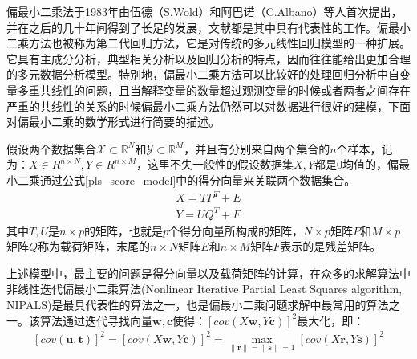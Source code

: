 偏最小二乘法于1983年由伍德（S.Wold）和阿巴诺（C.Albano）等人首次提出，并在之后的几十年间得到了长足的发展，文献\cite{KPLS,pls_PLS,pls_PLSR,pls_PLSR2,pls_PLSALL}都是其中具有代表性的工作。偏最小二乘方法也被称为第二代回归方法，它是对传统的多元线性回归模型的一种扩展。它具有主成分分析，典型相关分析以及回归分析的特点，因而往往能给出更加合理的多元数据分析模型。特别地，偏最小二乘方法可以比较好的处理回归分析中自变量多重共线性的问题，且当解释变量的数量超过观测变量的时候或者两者之间存在严重的共线性的关系的时候偏最小二乘方法仍然可以对数据进行很好的建模，下面对偏最小二乘的数学形式进行简要的描述。

假设两个数据集合${\mathcal{X} \subset \mathbb{R}^{N}}$和${\mathcal{Y} \subset \mathbb{R}^{M}}$，并且有分别来自两个集合的$n$个样本，记为：${X \in R^{n\times N},Y \in R^{n\times M}}$，这里不失一般性的假设数据集${X,Y}$都是${0}$均值的，偏最小二乘通过公式\ref{pls_score_model}中的得分向量来关联两个数据集合。
\begin{equation}
\begin{split}
\label{pls_score_model}
{X=TP^{T}+E}\\
{Y=UQ^{T}+F}
\end{split}
\end{equation}
其中${T,U}$是$n \times p$的矩阵，也就是$p$个得分向量所构成的矩阵，$N \times p$矩阵${P}$和$M \times p$矩阵${Q}$称为载荷矩阵，末尾的$n \times N$矩阵${E}$和$n \times M$矩阵${F}$表示的是残差矩阵。

上述模型中，最主要的问题是得分向量以及载荷矩阵的计算，在众多的求解算法中非线性迭代偏最小二乘算法(Nonlinear Iterative Partial Least Squares algorithm, NIPALS\cite{pls_NIPALS})是最具代表性的算法之一，也是偏最小二乘问题求解中最常用的算法之一。该算法通过迭代寻找向量$\bm{w,c}$使得：$[cov(X\bm{w},Y\bm{c})]^2$最大化，即：
\begin{equation}
\label{pls_max_cov}
\begin{split}
[cov(\bm{u},\bm{t})]^2=[cov(X\bm{w},Y\bm{c})]^2=\max_{\|\bm{r}\|=\|\bm{s}\|=1}[cov(X\bm{r},Y\bm{s})]^2
\end{split}
\end{equation}

